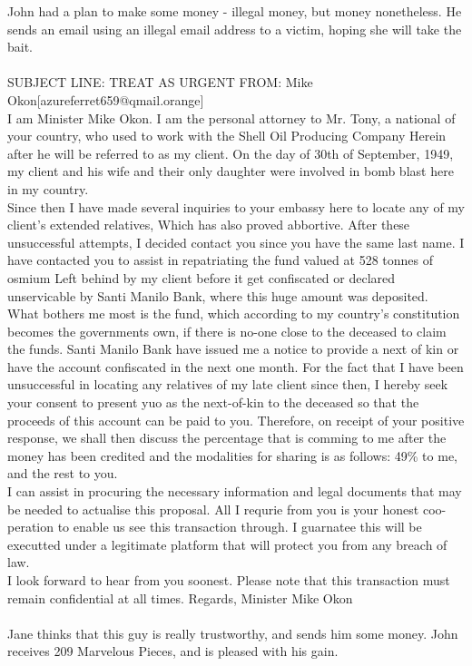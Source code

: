\documentclass{article}
\begin{document}
John had a plan to make some money {-} illegal money, but money nonetheless.
He sends an email using an illegal email address to a victim, hoping she will take the bait.
\\\\
SUBJECT LINE: TREAT AS URGENT
FROM: Mike Okon[azureferret659@qmail.orange]
\\
I am Minister Mike Okon.
I am the personal attorney to Mr. Tony, a national of your country, who used to work with the Shell Oil Producing Company
Herein after he will be referred to as my client.
On the day of 30th of September, 1949, my client and his wife and their only daughter were involved in bomb blast here in my country.
\\
Since then I have made several inquiries to your embassy here to locate any of my client's extended relatives, Which has also proved abbortive.
After these unsuccessful attempts, I decided contact you since you have the same last name.
I have contacted you to assist in repatriating the fund valued at 528 tonnes of osmium Left behind by my client before it get confiscated or declared unservicable by Santi Manilo Bank, where this huge amount was deposited.
\\
What bothers me most is the fund, which according to my country's constitution becomes the governments own, if there is no{-}one close to the deceased to claim the funds.
Santi Manilo Bank have issued me a notice to provide a next of kin or have the account confiscated in the next one month.
For the fact that I have been unsuccessful in locating any relatives of my late client since then, I hereby seek your consent to present yuo as the next{-}of{-}kin to the deceased so that the proceeds of this account can be paid to you.
Therefore, on receipt of your positive response, we shall then discuss the percentage that is comming to me after the money has been credited and the modalities for sharing is as follows: 49\% to me, and the rest to you.
\\
I can assist in procuring the necessary information and legal documents that may be needed to actualise this proposal.
All I requrie from you is your honest coo{-}peration to enable us see this transaction through.
I guarnatee this will be executted under a legitimate platform that will protect you from any breach of law.
\\
I look forward to hear from you soonest.
Please note that this transaction must remain confidential at all times.
Regards, Minister Mike Okon
\\\\
Jane thinks that this guy is really trustworthy, and sends him some money.
John receives 209 Marvelous Pieces, and is pleased with his gain.
\end{document}

